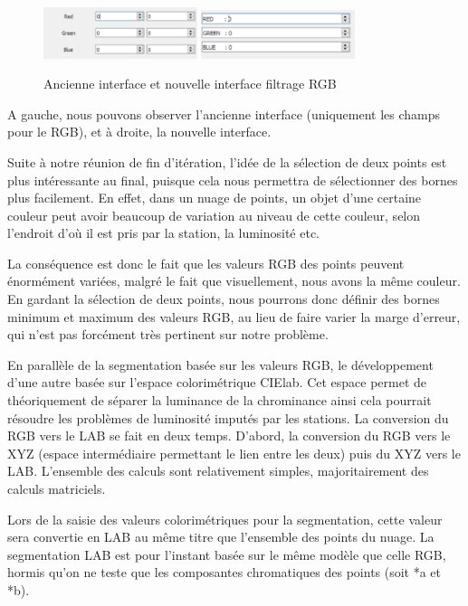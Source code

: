 \documentclass[12pt,titlepage,french]{article}
\begin{document}
\begin{figure}[!hbtp]
  \caption{\label{} Ancienne interface et nouvelle interface filtrage RGB}
  \includegraphics[width=0.4\textwidth]{./img/rgb_old.png}
\hspace*{1in}
\includegraphics[width=0.4\textwidth]{./img/rgb_new.png}
\end{figure}

A gauche, nous pouvons observer l'ancienne interface (uniquement les champs pour le RGB), et à droite, la nouvelle interface. \newline

Suite à notre réunion de fin d'itération, l'idée de la sélection de deux points est plus intéressante au final, puisque cela nous permettra de sélectionner des bornes plus facilement. En effet, dans un nuage de points, un objet d'une certaine couleur peut avoir beaucoup de variation au niveau de cette couleur, selon l'endroit d'où il est pris par la station, la luminosité etc. \newline

La conséquence est donc le fait que les valeurs RGB des points peuvent énormément variées, malgré le fait que visuellement, nous avons la même couleur. En gardant la sélection de deux points, nous pourrons donc définir des bornes minimum et maximum des valeurs RGB, au lieu de faire varier la marge d'erreur, qui n'est pas forcément très pertinent sur notre problème.

En parallèle de la segmentation basée sur les valeurs RGB, le développement d'une autre basée sur l'espace colorimétrique CIElab. Cet espace permet de théoriquement de séparer la luminance de la chrominance ainsi cela pourrait résoudre les problèmes de luminosité imputés par les stations.
La conversion du RGB vers le LAB se fait en deux temps. D'abord, la conversion du RGB vers le XYZ (espace intermédiaire permettant le lien entre les deux) puis du XYZ vers le LAB. L'ensemble des calculs sont relativement simples, majoritairement des calculs matriciels.

Lors de la saisie des valeurs colorimétriques pour la segmentation, cette valeur sera convertie en LAB au même titre que l'ensemble des points du nuage.
La segmentation LAB est pour l'instant basée sur le même modèle que celle RGB, hormis qu'on ne teste que les composantes chromatiques des points (soit *a et *b).
\end{document}
